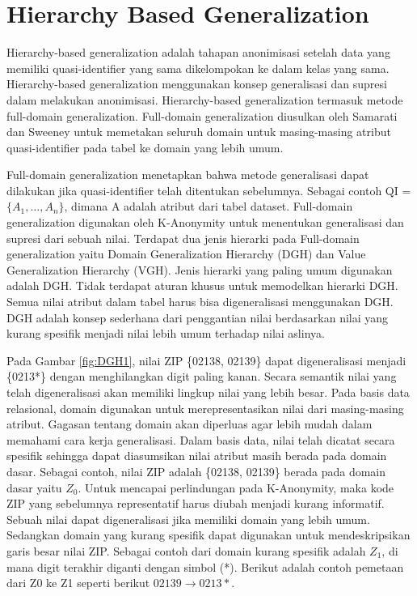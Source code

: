 \section{Hierarchy Based Generalization} 
Hierarchy-based generalization adalah tahapan anonimisasi setelah data yang memiliki quasi-identifier yang sama dikelompokan ke dalam kelas yang sama. Hierarchy-based generalization menggunakan konsep generalisasi dan supresi dalam melakukan anonimisasi. Hierarchy-based generalization termasuk metode full-domain generalization. Full-domain generalization diusulkan oleh Samarati dan Sweeney untuk memetakan seluruh domain untuk masing-masing atribut quasi-identifier pada tabel ke domain yang lebih umum.

\par Full-domain generalization menetapkan bahwa metode generalisasi dapat dilakukan jika quasi-identifier telah ditentukan sebelumnya. Sebagai contoh QI = $\{A_1, \ldots , A_n\}$, dimana A adalah atribut dari tabel dataset. Full-domain generalization digunakan oleh K-Anonymity  untuk menentukan generalisasi dan supresi dari sebuah nilai. Terdapat dua jenis hierarki pada Full-domain generalization yaitu Domain Generalization Hierarchy (DGH) dan Value Generalization Hierarchy (VGH). Jenis hierarki yang paling umum digunakan adalah DGH. Tidak terdapat aturan khusus untuk memodelkan hierarki DGH. Semua nilai atribut dalam tabel harus bisa digeneralisasi menggunakan DGH. DGH adalah konsep sederhana dari penggantian nilai berdasarkan nilai yang kurang spesifik menjadi nilai lebih umum terhadap nilai aslinya. 

Pada Gambar \ref{fig:DGH1}, nilai ZIP \{02138, 02139\} dapat digeneralisasi menjadi \{0213*\} dengan menghilangkan digit paling kanan. Secara semantik nilai yang telah digeneralisasi akan memiliki lingkup nilai yang lebih besar. Pada basis data relasional, domain digunakan untuk merepresentasikan nilai dari masing-masing atribut. Gagasan tentang domain akan diperluas agar lebih mudah dalam memahami cara kerja generalisasi. Dalam basis data, nilai telah dicatat secara spesifik sehingga dapat diasumsikan nilai atribut masih berada pada domain dasar. Sebagai contoh, nilai ZIP adalah \{02138, 02139\} berada pada domain dasar yaitu $Z_0$. Untuk mencapai perlindungan pada K-Anonymity, maka kode ZIP yang sebelumnya representatif harus diubah menjadi kurang informatif. Sebuah nilai dapat digeneralisasi jika memiliki domain yang lebih umum. Sedangkan domain yang kurang spesifik dapat digunakan untuk mendeskripsikan garis besar nilai ZIP. Sebagai contoh dari domain kurang spesifik adalah $Z_1$, di mana digit terakhir diganti dengan simbol (*). Berikut adalah contoh pemetaan dari Z0 ke Z1 seperti berikut $02139 \rightarrow 0213*$.

